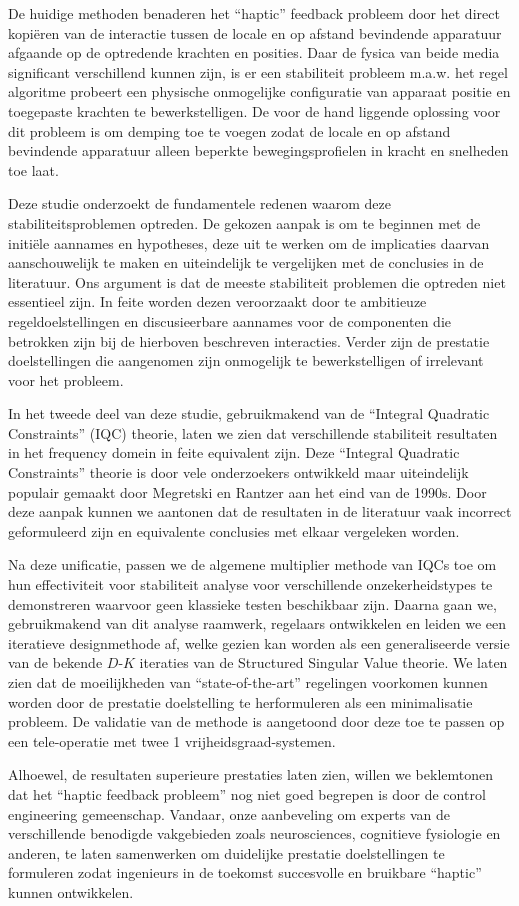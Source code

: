 De huidige methoden benaderen het \enquote{haptic} feedback probleem door het direct kopiëren van de interactie tussen de locale en op afstand 
bevindende apparatuur afgaande op de optredende krachten en posities. Daar de fysica van beide media significant verschillend kunnen zijn, 
is er een stabiliteit probleem m.a.w. het regel algoritme probeert een physische onmogelijke configuratie van apparaat positie en toegepaste 
krachten te bewerkstelligen. De voor de hand liggende oplossing voor dit probleem is om demping toe te voegen zodat de locale en op afstand 
bevindende apparatuur alleen beperkte bewegingsprofielen in kracht en snelheden toe laat.

Deze studie onderzoekt de fundamentele redenen waarom deze stabiliteitsproblemen optreden. De gekozen aanpak is om te beginnen met de 
initiële aannames en hypotheses, deze uit te werken om de implicaties daarvan aanschouwelijk te maken en uiteindelijk te vergelijken met de 
conclusies in de literatuur. Ons argument is dat de meeste stabiliteit problemen die optreden niet essentieel zijn. In feite worden dezen 
veroorzaakt door te ambitieuze regeldoelstellingen en discusieerbare aannames voor de componenten die betrokken zijn bij de hierboven 
beschreven interacties. Verder zijn de prestatie doelstellingen die aangenomen zijn onmogelijk te bewerkstelligen of irrelevant voor het 
probleem.

In het tweede deel van deze studie, gebruikmakend van de \enquote{Integral Quadratic Constraints} (IQC) theorie, laten we zien dat verschillende 
stabiliteit resultaten in het frequency domein in feite equivalent zijn. Deze \enquote{Integral Quadratic Constraints} theorie is door vele 
onderzoekers ontwikkeld maar uiteindelijk populair gemaakt door Megretski en Rantzer aan het eind van de 1990s. Door deze aanpak kunnen we 
aantonen dat de resultaten in de literatuur vaak incorrect geformuleerd zijn en equivalente conclusies met elkaar vergeleken worden.

Na deze unificatie, passen we de algemene multiplier methode van IQCs toe om hun effectiviteit voor stabiliteit analyse voor verschillende 
onzekerheidstypes te demonstreren waarvoor geen klassieke testen beschikbaar zijn. Daarna gaan we, gebruikmakend van dit analyse raamwerk, 
regelaars ontwikkelen en leiden we een iteratieve designmethode af, welke gezien kan worden als een generaliseerde versie van de bekende 
$D$-$K$ iteraties van de Structured Singular Value theorie. We laten zien dat de moeilijkheden van \enquote{state-of-the-art} regelingen voorkomen 
kunnen worden door de prestatie doelstelling te herformuleren als een minimalisatie probleem. De validatie van de methode is aangetoond 
door deze toe te passen op een tele-operatie met twee 1 vrijheidsgraad-systemen.

Alhoewel, de resultaten superieure prestaties laten zien, willen we beklemtonen dat het \enquote{haptic feedback probleem} nog niet goed 
begrepen is door de control engineering gemeenschap. Vandaar, onze aanbeveling om experts van de verschillende benodigde vakgebieden zoals 
neurosciences, cognitieve fysiologie en anderen, te laten samenwerken om duidelijke prestatie doelstellingen te formuleren zodat ingenieurs 
in de toekomst succesvolle en bruikbare \enquote{haptic} kunnen ontwikkelen.
